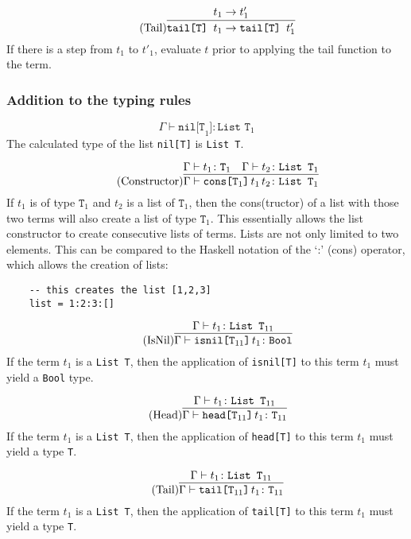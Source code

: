\begin{equation*}
    \tag{Tail}
    \infer{
        \texttt{tail[T] } t_1 \rightarrow \texttt{tail[T] } t'_1
    }{
        t_1 \rightarrow t'_1
    }
\end{equation*}
If there is a step from $t_1$ to $t'_1$, evaluate $t$ prior to applying
the tail function to the term.

\subsubsection{Addition to the typing rules \cite{pierce2002ProgLang}}
\begin{equation*}
    \tag{Nil}
    \Gamma \vdash \texttt{nil[T}_1\texttt{]} \colon \texttt{List T}_1
\end{equation*}
The calculated type of the list \texttt{nil[T]} is \texttt{List T}.

\begin{equation*}
    \tag{Constructor}
    \infer{
    \Gamma \vdash \texttt{cons[T}_1 \texttt{]}\,t_1\,t_2 \colon \texttt{List T}_1
    }{
    \Gamma \vdash t_1 \colon \texttt{T}_1 & \Gamma \vdash t_2 \colon \texttt{List T}_1
    }
\end{equation*}
If $t_1$ is of type $\texttt{T}_1$ and $t_2$ is a list of $\texttt{T}_1$,
then the cons(tructor) of a list with those two terms will also create
a list of type $\texttt{T}_1$. This essentially allows the list constructor
to create consecutive lists of terms. Lists are not only limited to two elements.
This can be compared to the Haskell notation of the `:' (cons) operator, which
allows the creation of lists:

\begin{verbatim}
    -- this creates the list [1,2,3]
    list = 1:2:3:[]
\end{verbatim}

\begin{equation*}
    \tag{IsNil}
    \infer{
    \Gamma \vdash \texttt{isnil[T}_{11} \texttt{]}\,t_1 \colon \texttt{Bool}
    }{
    \Gamma \vdash t_1 \colon \texttt{List T}_{11}
    }
\end{equation*}
If the term $t_1$ is a \texttt{List T}, then the application of
\texttt{isnil[T]} to this term $t_1$ must yield a \texttt{Bool} type.

\begin{equation*}
    \tag{Head}
    \infer{
    \Gamma \vdash \texttt{head[T}_{11} \texttt{]}\,t_1 \colon \texttt{T}_{11}
    }{
    \Gamma \vdash t_1 \colon \texttt{List T}_{11}
    }
\end{equation*}
If the term $t_1$ is a \texttt{List T}, then the application of
\texttt{head[T]} to this term $t_1$ must yield a type \texttt{T}.

\begin{equation*}
    \tag{Tail}
    \infer{
    \Gamma \vdash \texttt{tail[T}_{11} \texttt{]}\,t_1 \colon \texttt{T}_{11}
    }{
    \Gamma \vdash t_1 \colon \texttt{List T}_{11}
    }
\end{equation*}
If the term $t_1$ is a \texttt{List T}, then the application of
\texttt{tail[T]} to this term $t_1$ must yield a type \texttt{T}.
